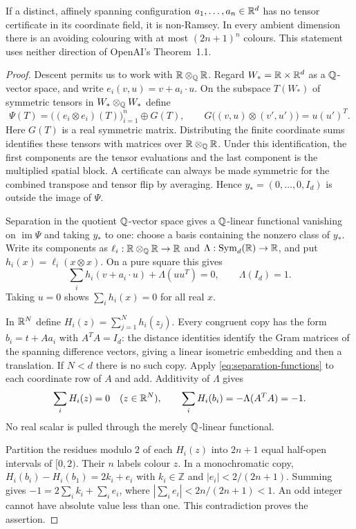\begin{proposition}\label{prop:necessity}
If a distinct, affinely spanning configuration $a_1,\ldots,a_n\in\mathbb R^d$
has no tensor certificate in its coordinate field, it is non-Ramsey.
In every ambient dimension there is an avoiding colouring with at most
$(2n+1)^n$ colours. This statement uses neither direction of OpenAI's
Theorem~1.1.
\end{proposition}
\begin{proof}
Descent permits us to work with $\mathbb R\otimes_\mathbb Q\mathbb R$. Regard
$W_*=\mathbb R\times\mathbb R^d$ as a $\mathbb Q$-vector space, and write
$e_i(v,u)=v+a_i\cdot u$. On the subspace $T(W_*)$ of symmetric
tensors in $W_*\otimes_\mathbb Q W_*$ define
\[
 \Psi(T)=\bigl((e_i\otimes e_i)(T)\bigr)_{i=1}^n\oplus G(T),
 \qquad
 G\bigl((v,u)\otimes(v',u')\bigr)=u(u')^T.
\]
Here $G(T)$ is a real symmetric matrix. Distributing the finite
coordinate sums identifies these tensors with matrices over
$\mathbb R\otimes_\mathbb Q\mathbb R$. Under this identification, the first components
are the tensor evaluations and the last component is the multiplied
spatial block. A certificate can always be made symmetric for the
combined transpose and tensor flip by averaging. Hence
$y_*=(0,\ldots,0,I_d)$ is outside the image of $\Psi$.

Separation in the quotient $\mathbb Q$-vector space gives a $\mathbb Q$-linear
functional vanishing on $\operatorname{im}\Psi$ and taking $y_*$ to
one: choose a basis containing the nonzero class of $y_*$.
Write its components as
$\ell_i:\mathbb R\otimes_\mathbb Q\mathbb R\to\mathbb R$ and
$\Lambda:\operatorname{Sym}_d(\mathbb R)\to\mathbb R$, and put
$h_i(x)=\ell_i(x\otimes x)$. On a pure square this gives
\begin{equation}\label{eq:separation-functions}
 \sum_i h_i(v+a_i\cdot u)+\Lambda(uu^T)=0,
 \qquad \Lambda(I_d)=1.
\end{equation}
Taking $u=0$ shows $\sum_i h_i(x)=0$ for all real $x$.

In $\mathbb R^N$ define $H_i(z)=\sum_{j=1}^N h_i(z_j)$.
Every congruent copy has the form $b_i=t+Aa_i$ with $A^TA=I_d$:
the distance identities identify the Gram matrices of the spanning
difference vectors, giving a linear isometric embedding and then a
translation. If $N<d$ there is no such copy. Apply
\eqref{eq:separation-functions} to each coordinate row of $A$ and
add. Additivity of $\Lambda$ gives
\[
 \sum_iH_i(z)=0\quad(z\in\mathbb R^N),\qquad
 \sum_iH_i(b_i)=-\Lambda(A^TA)=-1.
\]
No real scalar is pulled through the merely $\mathbb Q$-linear functional.

Partition the residues modulo $2$ of each $H_i(z)$ into $2n+1$
equal half-open intervals of $[0,2)$. Their $n$ labels colour $z$.
In a monochromatic copy,
$H_i(b_i)-H_i(b_1)=2k_i+e_i$ with $k_i\in\mathbb Z$ and
$|e_i|<2/(2n+1)$. Summing gives
$-1=2\sum_i k_i+\sum_i e_i$, where
$|\sum_i e_i|<2n/(2n+1)<1$. An odd integer cannot have absolute
value less than one. This contradiction proves the assertion.
\end{proof}

